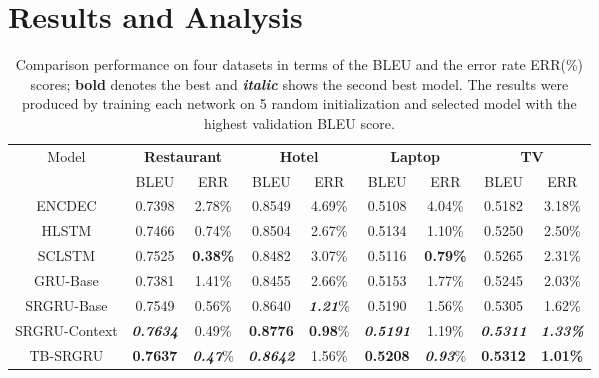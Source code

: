 \documentclass{llncs}
\begin{document}
\section{Results and Analysis}\label{sec:resultsandanalysis}
\begin{table*}[!ht]
\centering
\caption{Comparison performance on four datasets in terms of the BLEU and the error rate ERR(\%) scores; \textbf{bold} denotes the best and \textbf{\textit{italic}} shows the second best model. The results were produced by training each network on 5 random initialization and selected model with the highest validation BLEU score.}
\label{tab:tab-performance}
\begin{tabular}{ccccccccc}
\hline
\multirow{2}{*}{Model} & \multicolumn{2}{c}{\textbf{Restaurant}} & \multicolumn{2}{c}{\textbf{Hotel}} & \multicolumn{2}{c}{\textbf{Laptop}} & \multicolumn{2}{c}{\textbf{TV}} \\ \cline{2-9} 
 & BLEU & ERR & BLEU & ERR & BLEU & ERR & BLEU & ERR \\ \hline
ENCDEC & 0.7398 & 2.78\% & 0.8549 & 4.69\% & 0.5108 & 4.04\% & 0.5182 & 3.18\% \\
HLSTM & 0.7466 & 0.74\% & 0.8504 & 2.67\% & 0.5134 & 1.10\% & 0.5250 & 2.50\% \\
SCLSTM & 0.7525 & \textbf{0.38\%} & 0.8482 & 3.07\% & 0.5116 & \textbf{0.79\%} & 0.5265 & 2.31\% \\ \hline \hline
GRU-Base & 0.7381 & 1.41\% & 0.8455 & 2.66\% & 0.5153 & 1.77\% & 0.5245 & 2.03\% \\
SRGRU-Base & 0.7549 & 0.56\% & 0.8640 & \textbf{\textit{1.21}}\% & 0.5190 & 1.56\% & 0.5305 & 1.62\% \\
SRGRU-Context & \textit{\textbf{0.7634}} & 0.49\% & \textbf{0.8776} & \textbf{0.98}\% & \textit{\textbf{0.5191}} & 1.19\% & \textit{\textbf{0.5311}} & \textit{\textbf{1.33\%}} \\
TB-SRGRU & \textbf{0.7637} & \textbf{\textit{0.47}}\% & \textbf{\textit{0.8642}} & 1.56\% & \textbf{0.5208} & \textbf{\textit{0.93}}\% & \textbf{0.5312} & \textbf{1.01\%} \\ \hline
\end{tabular}
\end{table*}
\end{document}
